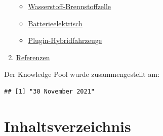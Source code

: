 \documentclass[
]{book}
\providecommand{\tightlist}{%
  \setlength{\itemsep}{0pt}\setlength{\parskip}{0pt}}
\begin{document}
\begin{enumerate}
  \begin{itemize}
  \tightlist
  \item
    \protect\hyperlink{FCEV}{Wasserstoff-Brennstoffzelle}\\
  \item
    \protect\hyperlink{bev}{Batterieelektrisch}\\
  \item
    \protect\hyperlink{plugin_hybrid}{Plugin-Hybridfahrzeuge}\\
  \end{itemize}
\item
  \protect\hyperlink{reference}{Referenzen}
\end{enumerate}

Der Knowledge Pool wurde zusammengestellt am:

\begin{verbatim}
## [1] "30 November 2021"
\end{verbatim}

\hypertarget{inhaltsverzeichnis}{%
\chapter*{Inhaltsverzeichnis}\label{inhaltsverzeichnis}}
\end{document}
